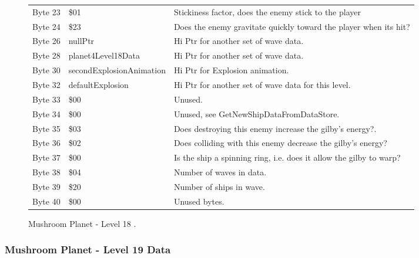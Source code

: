 \begin{figure}[H]
{\begin{adjustbox}{width=12cm}
\begin{tabular}{lll}
 Byte 23 & \$01                      & Stickiness factor, does the enemy stick to the player              \\
 Byte 24 & \$23                      & Does the enemy gravitate quickly toward the player when its hit?   \\
 Byte 26 & nullPtr                  & Hi Ptr for another set of wave data.                               \\
 Byte 28 & planet4Level18Data       & Hi Ptr for another set of wave data.                               \\
 Byte 30 & secondExplosionAnimation & Hi Ptr for Explosion animation.                                    \\
 Byte 32 & defaultExplosion         & Hi Ptr for another set of wave data for this level.                \\
 Byte 33 & \$00                      & Unused.                                                            \\
 Byte 34 & \$00                      & Unused, see GetNewShipDataFromDataStore.                           \\
 Byte 35 & \$03                      & Does destroying this enemy increase the gilby's energy?.           \\
 Byte 36 & \$02                      & Does colliding with this enemy decrease the gilby's energy?        \\
 Byte 37 & \$00                      & Is the ship a spinning ring, i.e. does it allow the gilby to warp? \\
 Byte 38 & \$04                      & Number of waves in data.                                           \\
 Byte 39 & \$20                      & Number of ships in wave.                                           \\
 Byte 40 & \$00                      & Unused bytes.                                                      \\
\bottomrule
\end{tabular}

  \end{adjustbox}

  }\caption*{Mushroom Planet - Level 18
.}
\end{figure}

\clearpage
\subsubsection{Mushroom Planet - Level 19 Data}

